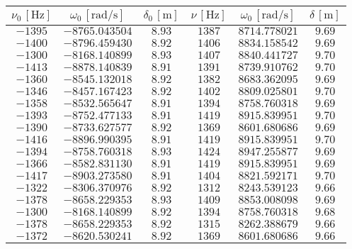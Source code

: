 \documentclass[]{article}
\begin{document}
    \begin{table}
        \centering

    \begin{tabular}{||c|c|c||c|c|c||}
        \hline
        $\nu_0\, [\text{Hz}] $ & $\omega_0\, [\text{rad/s}] $ & $\delta_0\, [\text{m}] $ & $\nu\, [\text{Hz}] $ & $\omega_0\, [\text{rad/s}] $ & $\delta\, [\text{m}] $ \\
        \hline\hline
        $-1395$ & $-8765.043504 $ & $8.93$ & $1387$ & $8714.778021$ & $9.69$\\\hline
        $-1400$ & $-8796.459430 $ & $8.92$ & $1406$ & $8834.158542$ & $9.69$\\\hline
        $-1300$ & $-8168.140899 $ & $8.93$ & $1407$ & $8840.441727$ & $9.70$\\\hline
        $-1413$ & $-8878.140839 $ & $8.91$ & $1391$ & $8739.910762$ & $9.70$\\\hline
        $-1360$ & $-8545.132018 $ & $8.92$ & $1382$ & $8683.362095$ & $9.69$\\\hline
        $-1346$ & $-8457.167423 $ & $8.92$ & $1402$ & $8809.025801$ & $9.70$\\\hline
        $-1358$ & $-8532.565647 $ & $8.91$ & $1394$ & $8758.760318$ & $9.69$\\\hline
        $-1393$ & $-8752.477133 $ & $8.91$ & $1419$ & $8915.839951$ & $9.70$\\\hline
        $-1390$ & $-8733.627577 $ & $8.92$ & $1369$ & $8601.680686$ & $9.69$\\\hline
        $-1416$ & $-8896.990395 $ & $8.91$ & $1419$ & $8915.839951$ & $9.70$\\\hline
        $-1394$ & $-8758.760318 $ & $8.93$ & $1424$ & $8947.255877$ & $9.69$\\\hline
        $-1366$ & $-8582.831130 $ & $8.91$ & $1419$ & $8915.839951$ & $9.69$\\\hline
        $-1417$ & $-8903.273580 $ & $8.91$ & $1404$ & $8821.592171$ & $9.70$\\\hline
        $-1322$ & $-8306.370976 $ & $8.92$ & $1312$ & $8243.539123$ & $9.66$\\\hline
        $-1378$ & $-8658.229353 $ & $8.93$ & $1409$ & $8853.008098$ & $9.69$\\\hline
        $-1300$ & $-8168.140899 $ & $8.92$ & $1394$ & $8758.760318$ & $9.68$\\\hline
        $-1378$ & $-8658.229353 $ & $8.92$ & $1315$ & $8262.388679$ & $9.66$\\\hline
        $-1372$ & $-8620.530241 $ & $8.92$ & $1369$ & $8601.680686$ & $9.66$\\\hline

\end{tabular}
\end{table}
\end{document}
